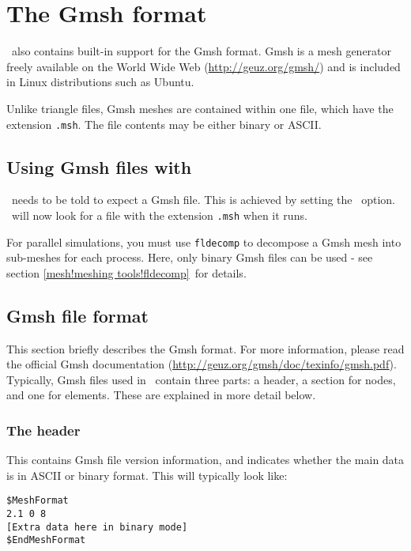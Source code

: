 \section{The Gmsh format}\label{sect:gmsh_format}


\fluidity\ also contains built-in support for the Gmsh format. Gmsh is a mesh
generator freely available on the World Wide Web
(\url{http://geuz.org/gmsh/}) and is included in
Linux distributions such as Ubuntu. 

Unlike triangle files, Gmsh meshes are contained within one file, which have
the extension \lstinline[language=bash]+.msh+. The file contents may
be either binary or ASCII.

\subsection{Using Gmsh files with \fluidity}\label{sect:using_gmsh}

\fluidity\ needs to be told to expect a Gmsh file. This is achieved by
setting the \onlypdf\linebreak{}\ option.  \fluidity\
will now look for a file with the extension \lstinline[language=bash]+.msh+ when it runs.

For parallel simulations, you must use \lstinline[language=bash]+fldecomp+ to decompose a Gmsh
mesh into sub-meshes for each process. Here, only binary Gmsh files can be
used - see section \ref{mesh!meshing tools!fldecomp}\ for details.

\subsection{Gmsh file format}\label{sect:gmsh_file_format}

This section briefly describes the Gmsh format. For more
information, please read the official Gmsh documentation
(\url{http://geuz.org/gmsh/doc/texinfo/gmsh.pdf}).
Typically, Gmsh files used in \fluidity\ contain three parts: a header, a
section for nodes, and one for elements. These are explained in more detail
below.



\subsubsection*{The header}\label{sect:gmsh_header_section}
This contains Gmsh file version information, and indicates whether the main data is in ASCII or binary format. This will typically look like:
\begin{lstlisting}
$MeshFormat
2.1 0 8
[Extra data here in binary mode]
$EndMeshFormat
\end{lstlisting}

